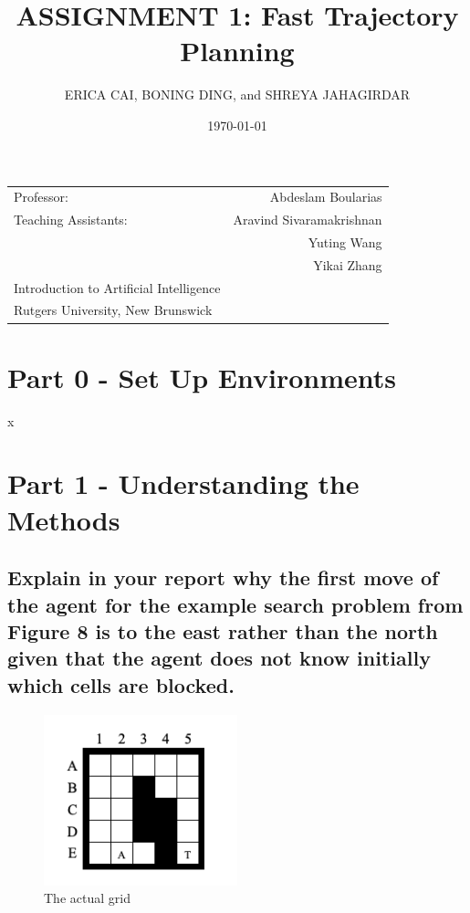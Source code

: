\documentclass{article}
\title{ASSIGNMENT 1: Fast Trajectory Planning} %
\author{ERICA CAI, BONING DING, and SHREYA JAHAGIRDAR} %
\date{\today} %
\begin{document}
\maketitle %

\begin{center}
\begin{tabular}{l r}
Professor: & Abdeslam Boularias \\ %
Teaching Assistants: & Aravind Sivaramakrishnan  \\ 
&  Yuting Wang \\ %
& Yikai Zhang \\

Introduction to Artificial Intelligence \\
Rutgers University, New Brunswick  \\
\end{tabular}
\end{center}


\section{Part 0 - Set Up Environments}

x

\section{Part 1 - Understanding the Methods}

\subsection{Explain in your report why the first move of the agent for the example search problem from Figure 8 is to the east rather
than the north given that the agent does not know initially which cells are blocked.}

\begin{figure}[h!]
  \includegraphics[width=0.5\textwidth]{p1_0.png}
  \caption{The actual grid }
\end{figure}
\end{document}
